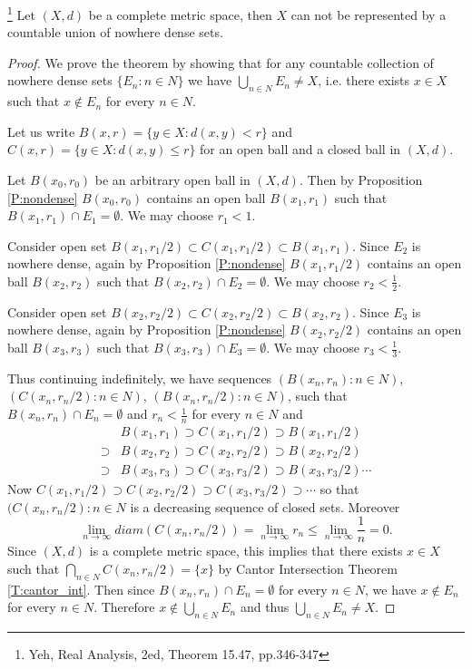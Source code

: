 \begin{theorem} \label{T:baire}
\footnote{Yeh, Real Analysis, 2ed, Theorem 15.47, pp.346-347}
Let $(X,d)$ be a complete metric space, then $X$ can not be represented by a
countable union of nowhere dense sets.
\end{theorem}
\begin{proof}
We prove the theorem by showing that for any countable collection of nowhere
dense sets $\{E_n:n\in N\}$ we have $\bigcup_{n\in N} E_n\neq X$, i.e. there exists
$x\in X$ such that $x\notin E_n$ for every $n\in N$.

Let us write $B(x,r)=\{y\in X:d(x,y)<r\}$ and $C(x,r)=\{y\in X:d(x,y)\le r\}$
for an open ball and a closed ball in $(X,d)$.

Let $B(x_0,r_0)$ be an arbitrary open ball in $(X,d)$. Then by Proposition
\ref{P:nondense} $B(x_0,r_0)$ contains an open ball $B(x_1,r_1)$ such that
$B(x_1,r_1)\cap E_1=\emptyset$. We may choose $r_1<1$.

Consider open set $B(x_1,r_1/2)\subset C(x_1,r_1/2)\subset B(x_1,r_1)$. Since
$E_2$ is nowhere dense, again by Proposition \ref{P:nondense} $B(x_1,r_1/2)$
contains an open ball $B(x_2,r_2)$ such that $B(x_2,r_2)\cap E_2=\emptyset$. We
may choose $r_2<\frac{1}{2}$.

Consider open set $B(x_2,r_2/2)\subset C(x_2,r_2/2)\subset B(x_2,r_2)$. Since
$E_3$ is nowhere dense, again by Proposition \ref{P:nondense} $B(x_2,r_2/2)$
contains an open ball $B(x_3,r_3)$ such that $B(x_3,r_3)\cap E_3=\emptyset$. We
may choose $r_3<\frac{1}{3}$.

Thus continuing indefinitely, we have sequences $(B(x_n,r_n):n\in N)$,
$(C(x_n,r_n/2):n\in N)$, $(B(x_n,r_n/2):n\in N)$, such that 
$B(x_n,r_n)\cap E_n=\emptyset$ and $r_n<\frac{1}{n}$ for every $n\in N$ and
\begin{align*}
	        & B(x_1,r_1) \supset C(x_1,r_1/2) \supset B(x_1,r_1/2)  \\
	\supset & B(x_2,r_2) \supset C(x_2,r_2/2) \supset B(x_2,r_2/2)  \\
	\supset & B(x_3,r_3) \supset C(x_3,r_3/2) \supset B(x_3,r_3/2) \cdots  
\end{align*}
Now $C(x_1,r_1/2) \supset C(x_2,r_2/2) \supset C(x_3,r_3/2)\supset\cdots$ so
that $(C(x_n,r_n/2):n\in N$ is a decreasing sequence of closed sets. Moreover
\[
	\lim_{n\to\infty} diam(C(x_n,r_n/2))
	  = \lim_{n\to\infty} r_n
	  \le\lim_{n\to\infty}\frac{1}{n} = 0.
\]
Since $(X,d)$ is a complete metric space,
this implies that there exists $x\in X$ such that
$\bigcap_{n\in N} C(x_n,r_n/2)=\{x\}$ by Cantor Intersection Theorem
\ref{T:cantor_int}. Then since $B(x_n,r_n)\cap E_n=\emptyset$ for every 
$n\in N$, we have $x\notin E_n$ for every $n\in N$. Therefore
$x\notin\bigcup_{n\in N} E_n$ and thus $\bigcup_{n\in N} E_n\neq X$. 
\end{proof}

